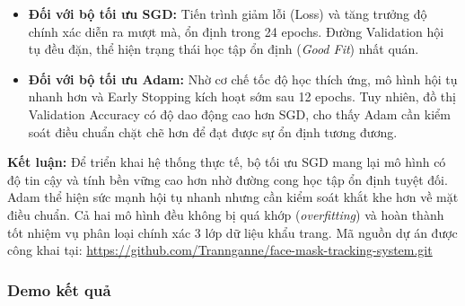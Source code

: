\documentclass[a4paper,12pt]{article}
\begin{document}
\begin{itemize}
    \item \textbf{Đối với bộ tối ưu SGD:} Tiến trình giảm lỗi (Loss) và tăng trưởng độ chính xác diễn ra mượt mà, ổn định trong 24 epochs. Đường Validation hội tụ đều đặn, thể hiện trạng thái học tập ổn định (\textit{Good Fit}) nhất quán.
    \item \textbf{Đối với bộ tối ưu Adam:} Nhờ cơ chế tốc độ học thích ứng, mô hình hội tụ nhanh hơn và Early Stopping kích hoạt sớm sau 12 epochs. Tuy nhiên, đồ thị Validation Accuracy có độ dao động cao hơn SGD, cho thấy Adam cần kiểm soát điều chuẩn chặt chẽ hơn để đạt được sự ổn định tương đương.
\end{itemize}

\noindent
\textbf{Kết luận:} Để triển khai hệ thống thực tế, bộ tối ưu SGD mang lại mô hình có độ tin cậy và tính bền vững cao hơn nhờ đường cong học tập ổn định tuyệt đối. Adam thể hiện sức mạnh hội tụ nhanh nhưng cần kiểm soát khắt khe hơn về mặt điều chuẩn. Cả hai mô hình đều không bị quá khớp (\textit{overfitting}) và hoàn thành tốt nhiệm vụ phân loại chính xác 3 lớp dữ liệu khẩu trang.
Mã nguồn dự án được công khai tại: \url{https://github.com/Trannganne/face-mask-tracking-system.git}
\subsubsection{Demo kết quả}
\end{document}
